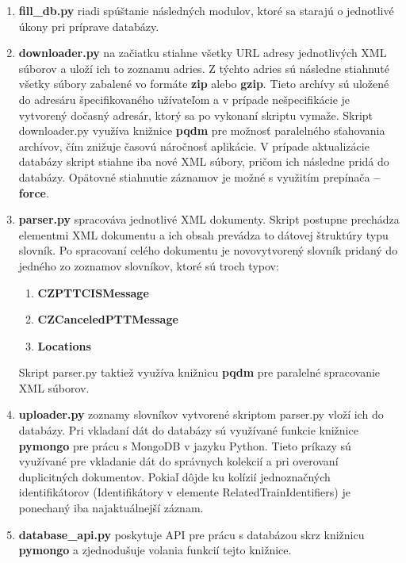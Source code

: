 \documentclass[10pt,xcolor=pdflatex,dvipsnames,table,oneside]{book}
\begin{document}
\begin{enumerate}
    \item \textbf{fill\_db.py} riadi spúštanie následných modulov, ktoré sa starajú o jednotlivé úkony pri príprave databázy. 
    \item \textbf{downloader.py} na začiatku stiahne všetky URL adresy jednotlivých XML súborov a uloží ich to zoznamu adries. Z týchto adries sú následne stiahnuté všetky súbory zabalené vo formáte \textbf{zip} alebo \textbf{gzip}. Tieto archívy sú uložené do adresáru špecifikovaného užívateľom a v prípade nešpecifikácie je vytvorený dočasný adresár, ktorý sa po vykonaní skriptu vymaže. Skript downloader.py využíva knižnice \textbf{pqdm} pre možnosť paralelného sťahovania archívov, čím znižuje časovú náročnosť aplikácie. V prípade aktualizácie databázy skript stiahne iba nové XML súbory, pričom ich následne pridá do databázy. Opätovné stiahnutie záznamov je možné s využitím prepínača \textbf{--force}.
    \item \textbf{parser.py} spracováva jednotlivé XML dokumenty. Skript postupne prechádza elementmi XML dokumentu a ich obsah prevádza to dátovej štruktúry typu slovník. Po spracovaní celého dokumentu je novovytvorený slovník pridaný do jedného zo zoznamov slovníkov, ktoré sú troch typov: 
    \begin{enumerate}
        \item \textbf{CZPTTCISMessage}
        \item \textbf{CZCanceledPTTMessage}
        \item \textbf{Locations}
    \end{enumerate}
    \par Skript parser.py taktiež využíva knižnicu \textbf{pqdm} pre paralelné spracovanie XML súborov.
    \item \textbf{uploader.py} zoznamy slovníkov vytvorené skriptom parser.py vloží ich do databázy. Pri vkladaní dát do databázy sú využívané funkcie knižnice \textbf{pymongo} pre prácu s MongoDB v jazyku Python. Tieto príkazy sú využívané pre vkladanie dát do správnych kolekcií a pri overovaní duplicitných dokumentov. Pokiaľ dôjde ku kolízií jednoznačných identifikátorov (Identifikátory v elemente RelatedTrainIdentifiers) je ponechaný iba najaktuálnejší záznam.
    \item \textbf{database\_api.py} poskytuje API pre prácu s databázou skrz knižnicu \textbf{pymongo} a zjednodušuje volania funkcií tejto knižnice.
\end{enumerate}
\end{document}

